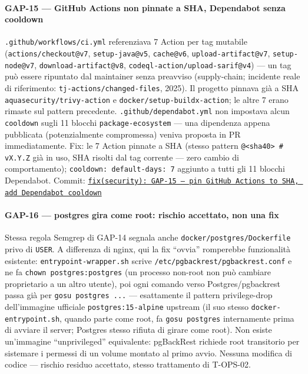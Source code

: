 ﻿\documentclass[a4paper,12pt]{report}
\newcommand{\commitref}[2]{\texttt{\small \href{https://github.com/diegoandruccioli/hotel-pms/commit/#1}{#2}}}
\begin{document}
\paragraph{GAP-15 --- GitHub Actions non pinnate a SHA, Dependabot senza cooldown}
\texttt{.github/workflows/ci.yml} referenziava 7 Action per tag mutabile
(\texttt{actions/checkout@v7}, \texttt{setup-java@v5}, \texttt{cache@v6},
\texttt{upload-artifact@v7}, \texttt{setup-node@v7}, \texttt{download-artifact@v8},
\texttt{codeql-action/upload-sarif@v4}) — un tag può essere ripuntato dal maintainer
senza preavviso (supply-chain; incidente reale di riferimento:
\texttt{tj-actions/changed-files}, 2025). Il progetto pinnava già a SHA
\texttt{aquasecurity/trivy-action} e \texttt{docker/setup-buildx-action}; le altre 7
erano rimaste sul pattern precedente. \texttt{.github/dependabot.yml} non impostava
alcun \texttt{cooldown} sugli 11 blocchi \texttt{package-ecosystem} — una dipendenza
appena pubblicata (potenzialmente compromessa) veniva proposta in PR immediatamente.
Fix: le 7 Action pinnate a SHA (stesso pattern \texttt{@<sha40> \# vX.Y.Z} già in uso,
SHA risolti dal tag corrente — zero cambio di comportamento);
\texttt{cooldown: default-days: 7} aggiunto a tutti gli 11 blocchi Dependabot.
Commit: \commitref{0cfbe60}{fix(security): GAP-15 --- pin GitHub Actions to SHA, add Dependabot cooldown}

\paragraph{GAP-16 --- postgres gira come root: rischio accettato, non una fix}
Stessa regola Semgrep di GAP-14 segnala anche \texttt{docker/postgres/Dockerfile} privo
di \texttt{USER}. A differenza di nginx, qui la fix ``ovvia'' romperebbe funzionalità
esistente: \texttt{entrypoint-wrapper.sh} scrive \texttt{/etc/pgbackrest/pgbackrest.conf}
e ne fa \texttt{chown postgres:postgres} (un processo non-root non può cambiare
proprietario a un altro utente), poi ogni comando verso Postgres/pgbackrest passa già
per \texttt{gosu postgres ...} — esattamente il pattern privilege-drop dell'immagine
ufficiale \texttt{postgres:15-alpine} upstream (il suo stesso
\texttt{docker-entrypoint.sh}, quando parte come root, fa \texttt{gosu postgres}
internamente prima di avviare il server; Postgres stesso rifiuta di girare come root).
Non esiste un'immagine ``unprivileged'' equivalente: pgBackRest richiede root
transitorio per sistemare i permessi di un volume montato al primo avvio. Nessuna
modifica di codice — rischio residuo accettato, stesso trattamento di T-OPS-02.
\end{document}
